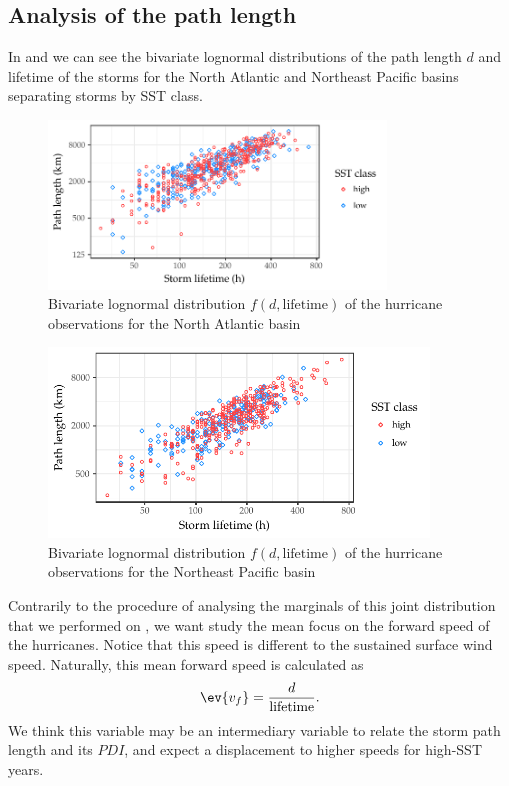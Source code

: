 \subsection{Analysis of the path length}
In  and  we can see the bivariate lognormal distributions of the path length $d$ and lifetime of the storms for the North Atlantic and Northeast Pacific basins separating storms by SST class.

\begin{figure}[H]
	\centering
	\includegraphics[width=0.8\textwidth]{images/natl-distance-bvln}
	\caption{Bivariate lognormal distribution $f(d, \text{lifetime})$ of the hurricane observations for the North Atlantic basin}
	\label{fig:natl-distance-bvln}
\end{figure}

\begin{figure}[H]
	\centering
	\includegraphics[width=0.9\textwidth]{images/epac-distance-bvln}
	\caption{Bivariate lognormal distribution $f(d, \text{lifetime})$ of the hurricane observations for the Northeast Pacific basin}
	\label{fig:epac-distance-bvln}
\end{figure}

Contrarily to the procedure of analysing the marginals of this joint distribution that we performed on , we want study the mean focus on the forward speed of the hurricanes. Notice that this speed is different to the sustained surface
wind speed. Naturally, this mean forward speed is calculated as
\begin{align}
	\ev{v_{f}} = \frac{d}{\text{lifetime}} .
\end{align}
We think this variable may be an intermediary variable to relate the storm path length and its $PDI$, and expect a displacement to higher speeds for high-SST years.

